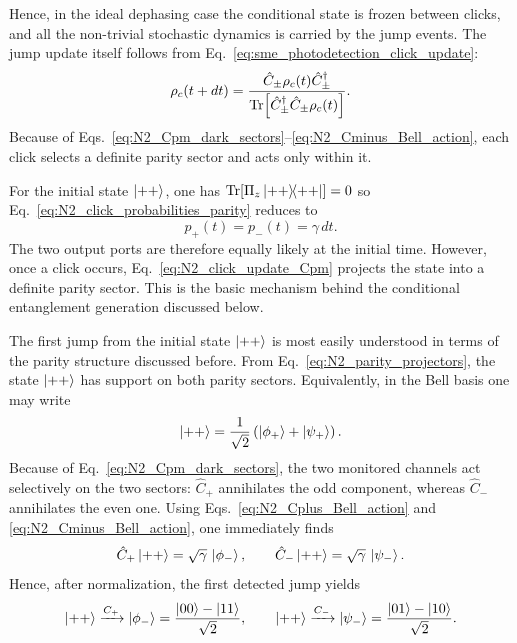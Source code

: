 Hence, in the ideal dephasing case the conditional state is frozen between clicks, and all the non-trivial stochastic dynamics is carried by the jump events. The jump update itself follows from Eq.~\eqref{eq:sme_photodetection_click_update}:
\begin{equation}
	\rho_c(t+dt)
	=
	\frac{\hat C_\pm \rho_c(t)\hat C_\pm^\dagger}
	{\Tr\!\left[\hat C_\pm^\dagger \hat C_\pm \rho_c(t)\right]}.
	\label{eq:N2_click_update_Cpm}
\end{equation}
Because of Eqs.~\eqref{eq:N2_Cpm_dark_sectors}--\eqref{eq:N2_Cminus_Bell_action}, each click selects a definite parity sector and acts only within it.

For the initial state \(\ket{++}\), one has $\Tr\!\left[\Pi_z\dyad{++}{++}\right]=0$ so Eq.~\eqref{eq:N2_click_probabilities_parity} reduces to
\begin{equation}
	p_+(t)=p_-(t)=\gamma\,dt.
	\label{eq:N2_click_probabilities_plusplus}
\end{equation}
The two output ports are therefore equally likely at the initial time. However, once a click occurs, Eq.~\eqref{eq:N2_click_update_Cpm} projects the state into a definite parity sector. This is the basic mechanism behind the conditional entanglement generation discussed below.

The first jump from the initial state \(\ket{++}\) is most easily understood in terms of the parity structure discussed before. From Eq.~\eqref{eq:N2_parity_projectors}, the state \(\ket{++}\) has support on both parity sectors. Equivalently, in the Bell basis one may write
\begin{equation}
	\ket{++}
	=
	\frac{1}{\sqrt{2}}
	\left(
	\ket{\phi_+}
	+
	\ket{\psi_+}
	\right).
	\label{eq:N2_plusplus_Bell_decomposition}
\end{equation}
Because of Eq.~\eqref{eq:N2_Cpm_dark_sectors}, the two monitored channels act selectively on the two sectors: \(\hat C_+\) annihilates the odd component, whereas \(\hat C_-\) annihilates the even one. Using Eqs.~\eqref{eq:N2_Cplus_Bell_action} and \eqref{eq:N2_Cminus_Bell_action}, one immediately finds
\begin{equation}
	\hat C_+\ket{++}
	=
	\sqrt{\gamma}\,\ket{\phi_-},
	\qquad
	\hat C_-\ket{++}
	=
	\sqrt{\gamma}\,\ket{\psi_-}.
	\label{eq:N2_Cpm_on_plusplus}
\end{equation}
Hence, after normalization, the first detected jump yields
\begin{equation}
	\ket{++}\xrightarrow{C_+}\ket{\phi_-}
	=
	\frac{\ket{00}-\ket{11}}{\sqrt{2}},
	\qquad
	\ket{++}\xrightarrow{C_-}\ket{\psi_-}
	=
	\frac{\ket{01}-\ket{10}}{\sqrt{2}}.
	\label{eq:N2_first_jump_result}
\end{equation}

